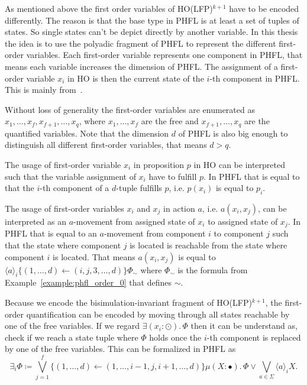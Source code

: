 As mentioned above the first order variables of HO(LFP)$^{k + 1}$ have to be encoded differently. The reason is that
the base type in PHFL is at least a set of tuples of states. So single states can't be depict directly by another
variable. In this thesis the idea is to use the polyadic fragment of PHFL to represent the different first-order
variables. Each first-order variable represents one component in PHFL, that means each variable increases the
dimension of PHFL. The assignment of a first-order variable $x_i$ in HO is then the current state of the $i$-th
component in PHFL. This is mainly from~\cite{lange2014capturing}.

Without loss of generality the first-order variables are enumerated as $x_1, \dots, x_f, x_{f + 1}, \dots, x_q$,
where $x_1, \dots, x_f$ are the free and $x_{f+1}, \dots, x_q$ are the quantified variables. Note that the dimension
$d$ of PHFL is also big enough to distinguish all different first-order variables, that means $d > q$.

The usage of first-order variable $x_i$ in proposition $p$ in HO can be interpreted such that the variable
assignment of $x_i$ have to fulfill $p$. In PHFL that is equal to that the $i$-th component of a $d$-tuple
fulfills $p$, i.e. $p(x_i)$ is equal to $p_i$.

The usage of first-order variables $x_i$ and $x_j$ in action $a$, i.e. $a(x_i, x_j)$, can be interpreted as an
$a$-movement from assigned state of $x_i$ to assigned state of $x_j$. In PHFL that is equal to an $a$-movement from
component $i$ to component $j$ such that the state where component $j$ is located is reachable from the state where
component $i$ is located. That means $a(x_i, x_j)$ is equal to $\langle a \rangle_i\{(1, \dots, d) \leftarrow (i, j,
3, \dots, d)\} \Phi_\sim$ where $\Phi_\sim$ is the formula from Example~\ref{example:phfl_order_0} that defines $\sim$.

Because we encode the bisimulation-invariant fragment of HO(LFP)$^{k + 1}$, the first-order quantification can be
encoded by moving through all states reachable by one of the free variables. If we regard $\exists (x_i \colon
\odot).\,\Phi$ then it can be understand as, check if we reach a state tuple where $\Phi$ holds once the $i$-th
component is replaced by one of the free variables. This can be formalized in PHFL as \[\exists_i \Phi \coloneqq
\bigvee_{j=1}^f \{(1, \dots, d) \leftarrow (1, \dots, i-1, j, i + 1, \dots, d)\} \mu (X \colon \bullet).\,\Phi \vee
\bigvee_{a \in \Sigma} \langle a \rangle_i X.\]

